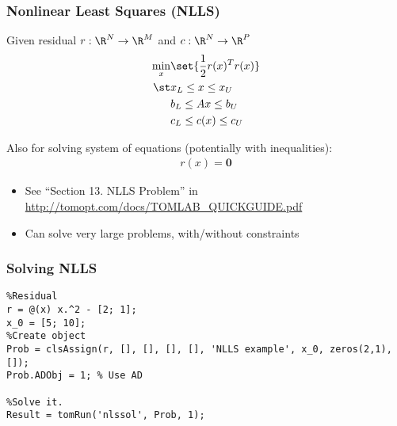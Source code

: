 \documentclass[nofootline]{etk-presentation}
\begin{document}
	
\begin{frame}\frametitle{}
	\bigskip
	\bigskip
	\bigskip	
	\begin{center}
		{\huge {}}
	\end{center}
\end{frame}

\begin{frame}[fragile]	\frametitle{Nonlinear Least Squares (NLLS)}
	Given residual $r : \R^N \to \R^M$ and $c : \R^N \to \R^P$
	\begin{align*}
		\min_x &\set{\frac{1}{2}r(x)^T r(x)}\\
		\st & x_L \leq x \leq x_U\\
		& b_L \leq A x \leq b_U\\
		& c_L \leq c(x) \leq c_U
	\end{align*}
	
	Also for solving system of equations (potentially with inequalities):
	\begin{align*}
		r(x) = \mathbf{0}
	\end{align*}
	\begin{itemize}
		\item See ``Section 13. NLLS Problem'' in \url{http://tomopt.com/docs/TOMLAB_QUICKGUIDE.pdf}
		\item Can solve very large problems, with/without constraints
	\end{itemize}
\end{frame}

\begin{frame}[fragile]	\frametitle{Solving NLLS}
	\begin{verbatim}
%Residual
r = @(x) x.^2 - [2; 1];	
x_0 = [5; 10];
%Create object
Prob = clsAssign(r, [], [], [], [], 'NLLS example', x_0, zeros(2,1),[]);
Prob.ADObj = 1; % Use AD

%Solve it.
Result = tomRun('nlssol', Prob, 1);
	\end{verbatim}
\end{frame}	
\begin{frame}\frametitle{}
		\bigskip
		\bigskip
		\bigskip	
		\begin{center}
			{\huge {}}
		\end{center}
\end{frame}
\end{document}
